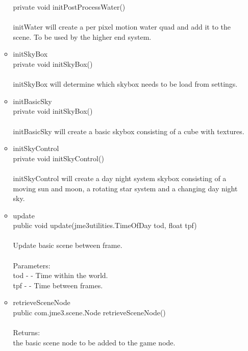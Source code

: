 \documentclass[letterpaper]{article}
\begin{document}
\begin{itemize}
\begin{itemize}
													private void initPostProcessWater() \\ \\
													initWater will create a per pixel motion water quad and add it to the scene. To be used by the higher end system. \\
											\item	initSkyBox \\
													private void initSkyBox() \\ \\ 
													initSkyBox will determine which skybox needs to be load from settings. \\
											\item	initBasicSky \\
													private void initSkyBox() \\ \\ 
													initBasicSky will create a basic skybox consisting of a cube with textures. \\
											\item	initSkyControl \\
													private void initSkyControl() \\ \\ 
													initSkyControl will create a day night system skybox consisting of a moving sun and moon, a rotating star system and a changing day night sky. \\
											\item	update \\
													public void update(jme3utilities.TimeOfDay tod,
				          float tpf) \\ \\
													Update basic scene between frame. \\ \\
													Parameters: \\
													tod - - Time within the world. \\
													tpf - - Time between frames. \\
											\item	retrieveSceneNode \\
													public com.jme3.scene.Node retrieveSceneNode() \\ \\
													Returns: \\
													the basic scene node to be added to the game node.
										\end{itemize}
							\end{itemize}
						
\end{document}
